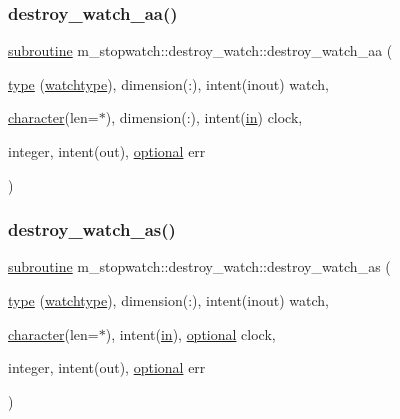 \subsubsection{\texorpdfstring{destroy\+\_\+watch\+\_\+aa()}{destroy\_watch\_aa()}}
{\footnotesize\ttfamily \hyperlink{M__stopwatch_83_8txt_acfbcff50169d691ff02d4a123ed70482}{subroutine} m\+\_\+stopwatch\+::destroy\+\_\+watch\+::destroy\+\_\+watch\+\_\+aa (\begin{DoxyParamCaption}\item[{\hyperlink{stop__watch_83_8txt_a70f0ead91c32e25323c03265aa302c1c}{type} (\hyperlink{structm__stopwatch_1_1watchtype}{watchtype}), dimension(\+:), intent(inout)}]{watch,  }\item[{\hyperlink{option__stopwatch_83_8txt_abd4b21fbbd175834027b5224bfe97e66}{character}(len=$\ast$), dimension(\+:), intent(\hyperlink{M__journal_83_8txt_afce72651d1eed785a2132bee863b2f38}{in})}]{clock,  }\item[{integer, intent(out), \hyperlink{option__stopwatch_83_8txt_aa4ece75e7acf58a4843f70fe18c3ade5}{optional}}]{err }\end{DoxyParamCaption})\hspace{0.3cm}{\ttfamily [private]}}

\mbox{\label{interfacem__stopwatch_1_1destroy__watch_a59ee0996ec4bdb3fdf7845e980bc7e24}} 
\subsubsection{\texorpdfstring{destroy\+\_\+watch\+\_\+as()}{destroy\_watch\_as()}}
{\footnotesize\ttfamily \hyperlink{M__stopwatch_83_8txt_acfbcff50169d691ff02d4a123ed70482}{subroutine} m\+\_\+stopwatch\+::destroy\+\_\+watch\+::destroy\+\_\+watch\+\_\+as (\begin{DoxyParamCaption}\item[{\hyperlink{stop__watch_83_8txt_a70f0ead91c32e25323c03265aa302c1c}{type} (\hyperlink{structm__stopwatch_1_1watchtype}{watchtype}), dimension(\+:), intent(inout)}]{watch,  }\item[{\hyperlink{option__stopwatch_83_8txt_abd4b21fbbd175834027b5224bfe97e66}{character}(len=$\ast$), intent(\hyperlink{M__journal_83_8txt_afce72651d1eed785a2132bee863b2f38}{in}), \hyperlink{option__stopwatch_83_8txt_aa4ece75e7acf58a4843f70fe18c3ade5}{optional}}]{clock,  }\item[{integer, intent(out), \hyperlink{option__stopwatch_83_8txt_aa4ece75e7acf58a4843f70fe18c3ade5}{optional}}]{err }\end{DoxyParamCaption})\hspace{0.3cm}{\ttfamily [private]}}

